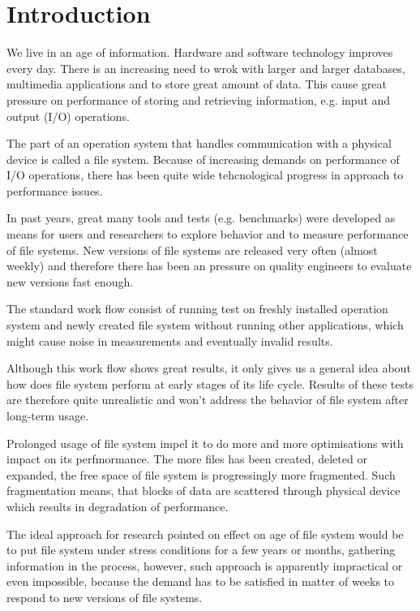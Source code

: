 \documentclass[
  color, %
  table, %
  lof,   %
  lot,   %
]{fithesis3}
\begin{document}
\chapter{Introduction}
We live in an age of information. Hardware and software technology improves every day. There is an increasing need to wrok with larger and larger databases, multimedia applications and to store great amount of data. This cause great pressure on performance of storing and retrieving information, e.g. input and output (I/O) operations.

The part of an operation system that handles communication with a physical device is called a file system. Because of increasing demands on performance  of I/O operations, there has been quite wide tehcnological progress in approach to performance issues.

In past years, great many tools and tests (e.g. benchmarks) were developed as means for users and researchers to explore behavior and to measure performance of file systems. New versions of file systems are released very often (almost weekly) and therefore there has been an pressure on quality engineers to evaluate new versions fast enough.

The standard work flow consist of running test on freshly installed operation system and newly created file system without running other applications, which might cause noise in measurements and eventually invalid results.

Although this work flow shows great results, it only gives us a general idea about how does file system perform at early stages of its life cycle. Results of these tests are therefore quite unrealistic and won't address the behavior of file system after long-term usage.

Prolonged usage of file system impel it to do more and more optimisations with impact on its perfmormance. The more files has been created, deleted or expanded, the free space of file system is progressingly more fragmented. Such fragmentation means, that blocks of data are scattered through physical device which results in degradation of performance.

The ideal approach for research pointed on effect on age of file system would be to put file system under stress conditions for a few years or months, gathering information in the process, however, such approach is apparently impractical or even impossible, because the demand has to be satisfied in matter of weeks to respond to new versions of file systems.
\end{document}
